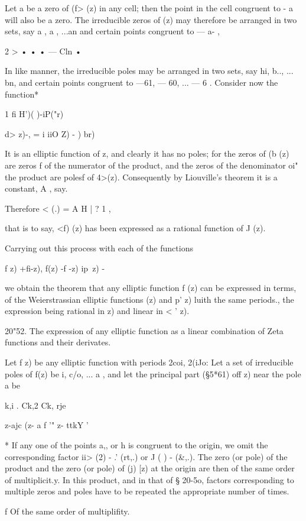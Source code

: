 {Let a be a zero of (f> (z) in any cell; then the point in the cell
congruent to - a will also be a zero. The irreducible zeros of (z) may
therefore be arranged in two sets, say a , a , ...an and certain
points congruent to — a- ,

 2 > • • • — Cln •

In like manner, the irreducible poles may be arranged in two sets, say
hi, b.., ... bn, and certain points congruent to —61, — 60, ... — 6 .
Consider now the function*

1 fi H')( )-iP("r)

d> z)-, = i iiO Z) - ) br)

It is an elliptic function of z, and clearly it has no poles; for the
zeros of (b (z) are zeros f of the numerator of the product, and the
zeros of the denominator oi" the product are polesf of 4>(z).
Consequently by Liouville's theorem it is a constant, A , say.

Therefore < (.) = A H | ? 1 ,

that is to say, <f) (z) has been expressed as a rational function of J
(z).

Carrying out this process with each of the functions

f z) +fi-z), f(z) -f -z) ip\ z) -\

we obtain the theorem that any elliptic function f (z) can be
expressed in terms, of the Weierstrassian elliptic functions (z) and
p' z) luith the same periods., the expression being rational in z) and
linear in < ' z).

20"52. The expression of any elliptic function as a linear combination
of Zeta functions and their derivates.

Let f z) be any elliptic function with periods 2coi, 2(iJo: Let a set
of irreducible poles of f(z) be i, c/o, ... a , and let the principal
part (§5*61) off z) near the pole a be

 k,i . Ck,2 Ck, rje

z-ajc (z- a f '" z- ttkY '

* If any one of the points a,, or h is congruent to the origin, we
omit the corresponding factor ii> (2) - .' (rt,.) or J ( ) - (\&,.).
The zero (or pole) of the product and the zero (or pole) of (j) [z) at
the origin are then of the same order of multiplicit.y. In this
product, and in that of § 20-5o, factors corresponding to multiple
zeros and poles have to be repeated the appropriate number of times.

f Of the same order of multiplifity.

}
